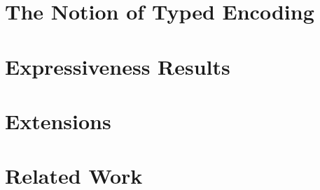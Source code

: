 \documentclass[preprint,nocopyrightspace]{sigplanconf}
\begin{document}
%

%

%

%

%

%

\section{The Notion of Typed Encoding}
\label{s:expr}


\section{Expressiveness Results}
\label{sec:positive}




\section{Extensions}
\label{sec:extension}


\section{Related Work}
\label{sec:relwork}

\end{document}
